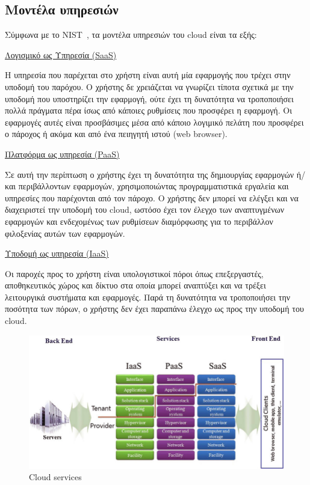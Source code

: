 \subsection{Μοντέλα υπηρεσιών}

Σύμφωνα με το NIST~\cite{mell2011nist}, τα μοντέλα υπηρεσιών του cloud είναι τα
εξής:

\vspace{2ex}
\underline{Λογισμικό ως Υπηρεσία (SaaS)}

\vspace{1ex}
Η υπηρεσία που παρέχεται στο χρήστη είναι αυτή μία εφαρμογής που τρέχει  στην
υποδομή του παρόχου. Ο χρήστης δε χρειάζεται να γνωρίζει τίποτα σχετικά με την
υποδομή που υποστηρίζει την εφαρμογή, ούτε έχει τη δυνατότητα να τροποποιήσει
πολλά πράγματα πέρα ίσως από κάποιες ρυθμίσεις που προσφέρει η εφαρμογή. Οι
εφαρμογές αυτές είναι προσβάσιμες μέσα από κάποιο λογιμικό πελάτη που προσφέρει
ο πάροχος ή ακόμα και από ένα πειηγητή ιστού (web browser).

\vspace{2ex}
\underline{Πλατφόρμα ως υπηρεσία (PaaS)}

\vspace{1ex}
Σε αυτή την περίπτωση ο χρήστης έχει τη δυνατότητα της δημιουργίας εφαρμογών
ή/και περιβάλλοντων εφαρμογών, χρησιμοποιώντας προγραμματιστικά εργαλεία και
υπηρεσίες που παρέχονται από τον πάροχο. Ο χρήστης δεν μπορεί να ελέγξει και να
διαχειριστεί την υποδομή του cloud, ωστόσο έχει τον έλεγχο των αναπτυγμένων
εφαρμογών και ενδεχομένως των ρυθμίσεων διαμόρφωσης για το περιβάλλον φιλοξενίας
αυτών των εφαρμογών.

\vspace{2ex}
\underline{Υποδομή ως υπηρεσία (IaaS)}

\vspace{1ex}
Οι παροχές προς το χρήστη είναι υπολογιστικοί πόροι όπως επεξεργαστές,
αποθηκευτικός χώρος και δίκτυο στα οποία μπορεί αναπτύξει και να τρέξει
λειτουργικά συστήματα και εφαρμογές. Παρά τη δυνατότητα να τροποποιήσει την
ποσότητα των πόρων, ο χρήστης δεν έχει παραπάνω έλεγχο ως προς την υποδομή του
cloud. 

\begin{figure}[htp]
\centering
\includegraphics[scale=0.50]{figures/Cloud-service-stack.png}
\caption{Cloud services\label{fig1}}
\end{figure}

